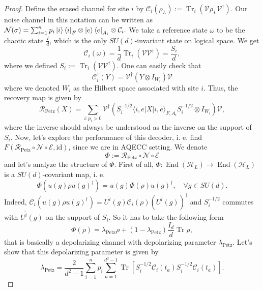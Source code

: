 \documentclass[11pt,letterpaper]{article}
\theoremstyle{plain}
\theoremstyle{plain}
\theoremstyle{plain}
\theoremstyle{plain}
\theoremstyle{plain}
\theoremstyle{plain}
\theoremstyle{plain}
\theoremstyle{definition}
\theoremstyle{plain}
\begin{document}
\begin{proof}
Define the erased channel for site $i$ by
$
    \mathcal{C}_i\left(\rho_L\right):=\operatorname{Tr}_{i}\left(\mathcal{V} \rho_L \mathcal{V}^{\dagger}\right).
$
Our noise channel in this notation can be written as
$
    \mathcal{N}(\sigma)=\sum_{i=1}^n p_i\ket{i}\bra{i}_F \otimes \ket{e}\bra{e}_{A_i}\otimes \mathcal{C}_i.
$
We take a reference state $\omega$ to be the chaotic state $\frac{I}{d}$, which is the only $SU(d)$-invariant state on logical space. We get
\[
    \mathcal{C}_i\left(\omega\right)=\frac{1}{d} \operatorname{Tr}_i\left(\mathcal{V} \mathcal{V}^{\dagger}\right)=\frac{S_i}{d},
\]
where we defined $S_i:=\operatorname{Tr}_i\left(\mathcal{V} \mathcal{V}^{\dagger}\right)$. One can easily check that
\[
    \mathcal{C}_i^{\dagger}(Y)=\mathcal{V}^{\dagger}\left(Y \otimes I_{W_i}\right) \mathcal{V}
\]
where we denoted $W_i$ as the Hilbert space associated with site $i$. Thus, the recovery map is given by
\[
    \mathcal{R}_{\mathrm{Petz}}(X)=\sum_{i: p_i>0} \mathcal{V}^{\dagger}\left(S_i^{-1 / 2} \langle i, e| X|i,e\rangle_{F, A_i} S_i^{-1 / 2} \otimes I_{W_i}\right) \mathcal{V},
\]
where the inverse should always be understood as the inverse on the support of $S_i$. Now, let's explore the performance of this decoder, 
i. e. find $F\left(\mathcal{R}_{\mathrm{Petz}} \circ \mathcal{N}\circ \mathcal{E}, \mathrm{id}\right)$, since we 
are in AQECC setting. We denote
\[
    \Phi:=\mathcal{R}_{\mathrm{Petz}} \circ \mathcal{N}\circ \mathcal{E}
\]
and let's analyze the structure of $\Phi$. First of all, $\Phi: \operatorname{End}(\mathcal{H}_L)\rightarrow \operatorname{End}(\mathcal{H}_L)$ is a 
$SU(d)$-covariant map, i. e.
\[
    \Phi\left(u(g) \rho u(g)^{\dagger}\right)=u(g) \Phi(\rho) u(g)^{\dagger}, \quad \forall g \in SU(d).
\]
Indeed, $\mathcal{C}_i\left(u(g) \rho u(g)^{\dagger}\right)=U^{\hat{i}}(g) \mathcal{C}_i(\rho) \left(U^{\hat{i}}(g)\right)^{\dagger}$ and $S_i^{-1 / 2}$ 
commutes with $U^{\hat{i}}(g)$ on the support of $S_i$. So it has to take the following form
\[
    \Phi(\rho)=\lambda_{\mathrm{Petz}} \rho+\left(1-\lambda_{\mathrm{Petz}}\right) \frac{I_d}{d} \operatorname{Tr} \rho,
\]
that is basically a depolarizing channel with depolarizing parameter $\lambda_{\mathrm{Petz}}$. Let's show that this depolarizing parameter is given by
\begin{equation}\label{eq:lambdaPetz}
    \lambda_{\text{Petz}}=\frac{2}{d^2-1}\sum_{i=1}^n p_i \sum_{a=1}^{d^2-1} \operatorname{Tr}\left[S_i^{-1 / 2} \mathcal{C}_i\left(t_a\right) 
    S_i^{-1 / 2} \mathcal{C}_i\left(t_a\right)\right] .

\end{equation}
\end{proof}
\end{document}
